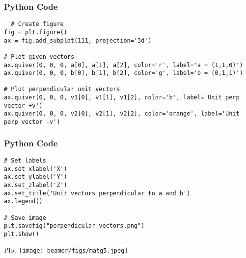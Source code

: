 \documentclass{beamer}
\begin{document}
\begin{frame}[fragile]
    \frametitle{Python Code}
    \begin{lstlisting}
  # Create figure
fig = plt.figure()
ax = fig.add_subplot(111, projection='3d')

# Plot given vectors
ax.quiver(0, 0, 0, a[0], a[1], a[2], color='r', label='a = (1,1,0)')
ax.quiver(0, 0, 0, b[0], b[1], b[2], color='g', label='b = (0,1,1)')

# Plot perpendicular unit vectors
ax.quiver(0, 0, 0, v1[0], v1[1], v1[2], color='b', label='Unit perp vector +v')
ax.quiver(0, 0, 0, v2[0], v2[1], v2[2], color='orange', label='Unit perp vector -v')

    \end{lstlisting}
\end{frame}

\begin{frame}[fragile]
    \frametitle{Python Code}
    \begin{lstlisting}
# Set labels
ax.set_xlabel('X')
ax.set_ylabel('Y')
ax.set_zlabel('Z')
ax.set_title('Unit vectors perpendicular to a and b')
ax.legend()

# Save image
plt.savefig("perpendicular_vectors.png")
plt.show()
    \end{lstlisting}
\end{frame}

\begin{frame}{Plot}
    \centering
    \texttt{[image: beamer/figs/matg5.jpeg]}     
\end{frame}
\end{document}
